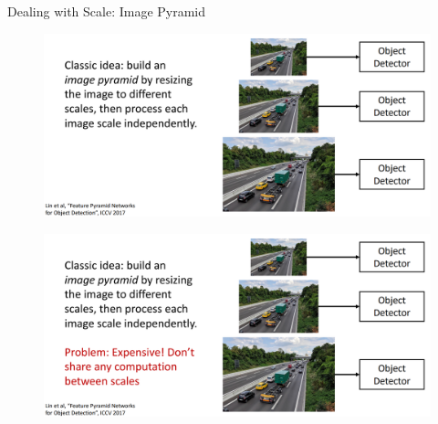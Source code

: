 \documentclass[10pt]{beamer}
\theoremstyle{remark}
\theoremstyle{definition}
\begin{document}
\begin{frame}[allowframebreaks]{Dealing with Scale: Image Pyramid}
\begin{figure}
\centering
\includegraphics[width=1.0\textwidth,height=1.0\textheight,keepaspectratio]{./images/scale_2.png}
\end{figure}

\framebreak

\begin{figure}
\centering
\includegraphics[width=1.0\textwidth,height=1.0\textheight,keepaspectratio]{./images/scale_3.png}
\end{figure}
    
\end{frame}
\end{document}
